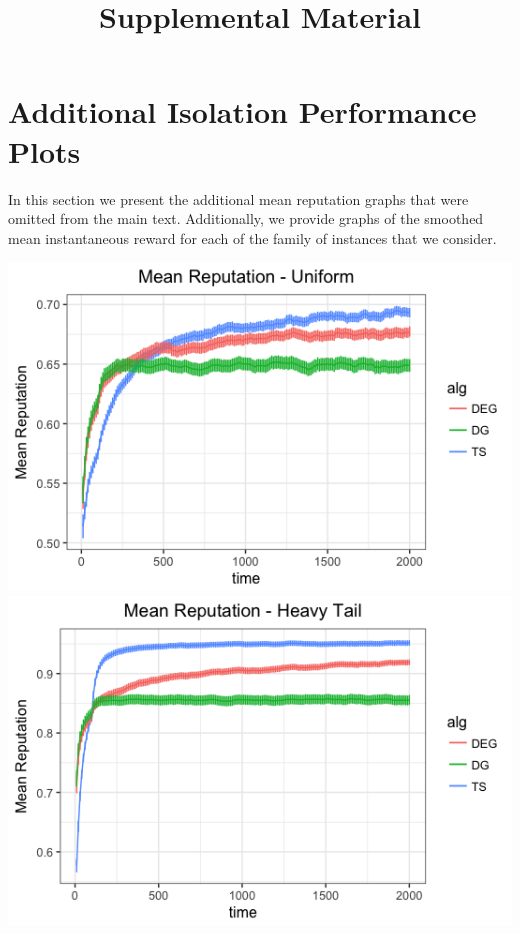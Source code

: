 \documentclass[11pt,letterpaper]{article}
\begin{document}
 

\title{Supplemental Material}
\date{}
\maketitle

\appendix
\section{Additional Isolation Performance Plots}

In this section we present the additional mean reputation graphs that were omitted from the main text. Additionally, we provide graphs of the smoothed mean instantaneous reward for each of the family of instances that we consider.

\begin{center}
\includegraphics[scale=0.5]{figures/uniform_mean} \\
\includegraphics[scale=0.5]{figures/ht_mean} \\

\end{center}
\end{document}
